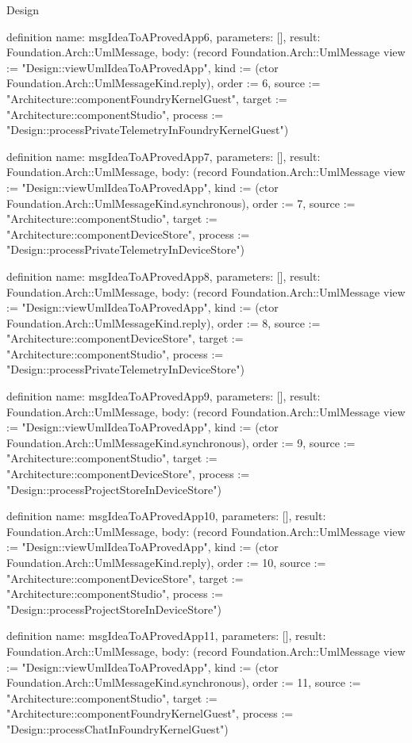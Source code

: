 \begin{lexlean}{Design}
\begin{semanticmodule}
definition{
  name: msgIdeaToAProvedApp6,
  parameters: [],
  result: Foundation.Arch::UmlMessage,
  body: (record Foundation.Arch::UmlMessage {view := "Design::viewUmlIdeaToAProvedApp", kind := (ctor Foundation.Arch::UmlMessageKind.reply), order := 6, source := "Architecture::componentFoundryKernelGuest", target := "Architecture::componentStudio", process := "Design::processPrivateTelemetryInFoundryKernelGuest"})
}

definition{
  name: msgIdeaToAProvedApp7,
  parameters: [],
  result: Foundation.Arch::UmlMessage,
  body: (record Foundation.Arch::UmlMessage {view := "Design::viewUmlIdeaToAProvedApp", kind := (ctor Foundation.Arch::UmlMessageKind.synchronous), order := 7, source := "Architecture::componentStudio", target := "Architecture::componentDeviceStore", process := "Design::processPrivateTelemetryInDeviceStore"})
}

definition{
  name: msgIdeaToAProvedApp8,
  parameters: [],
  result: Foundation.Arch::UmlMessage,
  body: (record Foundation.Arch::UmlMessage {view := "Design::viewUmlIdeaToAProvedApp", kind := (ctor Foundation.Arch::UmlMessageKind.reply), order := 8, source := "Architecture::componentDeviceStore", target := "Architecture::componentStudio", process := "Design::processPrivateTelemetryInDeviceStore"})
}

definition{
  name: msgIdeaToAProvedApp9,
  parameters: [],
  result: Foundation.Arch::UmlMessage,
  body: (record Foundation.Arch::UmlMessage {view := "Design::viewUmlIdeaToAProvedApp", kind := (ctor Foundation.Arch::UmlMessageKind.synchronous), order := 9, source := "Architecture::componentStudio", target := "Architecture::componentDeviceStore", process := "Design::processProjectStoreInDeviceStore"})
}

definition{
  name: msgIdeaToAProvedApp10,
  parameters: [],
  result: Foundation.Arch::UmlMessage,
  body: (record Foundation.Arch::UmlMessage {view := "Design::viewUmlIdeaToAProvedApp", kind := (ctor Foundation.Arch::UmlMessageKind.reply), order := 10, source := "Architecture::componentDeviceStore", target := "Architecture::componentStudio", process := "Design::processProjectStoreInDeviceStore"})
}

definition{
  name: msgIdeaToAProvedApp11,
  parameters: [],
  result: Foundation.Arch::UmlMessage,
  body: (record Foundation.Arch::UmlMessage {view := "Design::viewUmlIdeaToAProvedApp", kind := (ctor Foundation.Arch::UmlMessageKind.synchronous), order := 11, source := "Architecture::componentStudio", target := "Architecture::componentFoundryKernelGuest", process := "Design::processChatInFoundryKernelGuest"})
}


\end{semanticmodule}
\end{lexlean}
